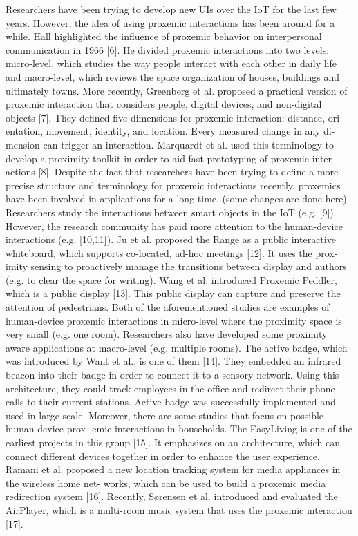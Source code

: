 \documentclass[runningheads,a4paper]{llncs}
\begin{document}
Researchers have been trying to develop new UIs over the IoT for the last few years. However, the idea of using proxemic interactions has been around for a while. Hall highlighted the influence of proxemic behavior on interpersonal communication in 1966 [6]. He divided proxemic interactions into two levels: micro-level, which studies the way people interact with each other in daily life and macro-level, which reviews the space organization of houses, buildings and ultimately towns. More recently, Greenberg et al. proposed a practical version of proxemic interaction that considers people, digital devices, and non-digital objects [7]. They defined five dimensions for proxemic interaction: distance, ori- entation, movement, identity, and location. Every measured change in any di- mension can trigger an interaction. Marquardt et al. used this terminology to develop a proximity toolkit in order to aid fast prototyping of proxemic inter- actions [8]. Despite the fact that researchers have been trying to define a more precise structure and terminology for proxemic interactions recently, proxemics have been involved in applications for a long time. 
\newline
\newpage
(some changes are done here)
Researchers study the interactions between smart objects in the IoT (e.g. [9]). However, the research community has paid more attention to the human-device interactions (e.g. [10,11]). Ju et al. proposed the Range as a public interactive whiteboard, which supports co-located, ad-hoc meetings [12]. It uses the prox- imity sensing to proactively manage the transitions between display and authors (e.g. to clear the space for writing). Wang et al. introduced Proxemic Peddler, which is a public display [13]. This public display can capture and preserve the attention of pedestrians. Both of the aforementioned studies are examples of human-device proxemic interactions in micro-level where the proximity space is very small (e.g. one room). Researchers also have developed some proximity aware applications at macro-level (e.g. multiple rooms). The active badge, which was introduced by Want et al., is one of them [14]. They embedded an infrared beacon into their badge in order to connect it to a sensory network. Using this architecture, they could track employees in the office and redirect their phone calls to their current stations. Active badge was successfully implemented and used in large scale. 
\newline
Moreover, there are some studies that focus on possible human-device prox- emic interactions in households. The EasyLiving is one of the earliest projects in this group [15]. It emphasizes on an architecture, which can connect different devices together in order to enhance the user experience. Ramani et al. proposed a new location tracking system for media appliances in the wireless home net- works, which can be used to build a proxemic media redirection system [16]. Recently, Sørensen et al. introduced and evaluated the AirPlayer, which is a multi-room music system that uses the proxemic interaction [17]. \newline
\end{document}
